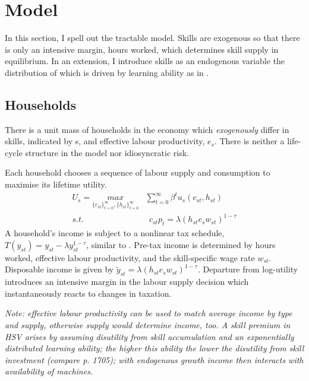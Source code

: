 \section{Model}

In this section, I spell out the tractable model. Skills are exogenous so that there is only an intensive margin, hours worked, which determines skill supply in equilibrium. In an extension, I introduce  skills as an endogenous variable the distribution of which is driven by learning ability as in \cite{Heathcote2017OptimalFramework}. 

\subsection{Households}
There is a unit mass of households in the economy which \textit{exogenously} differ in skills, indicated by s, and effective labour productivity, $e_{s}$. There is neither a life-cycle structure in the model nor idiosyncratic risk.

Each household chooses a sequence of labour supply and consumption to maximise its lifetime utility. 
\begin{align}
U_{s}=\underset{\{c_{st}\}_{t=0}^{\infty}, \{h_{st}\}_{t=0}^{\infty}}{max}&\sum_{t=0}^{\infty}\beta^t u_s(c_{st}, h_{st})\\
s.t.& \ \ c_{st}p_{t}=\lambda \left(h_{st}e_{s}w_{st}\right)^{1-\tau}
\end{align}
A household's income is subject to a nonlinear tax schedule, $T(y_{st})=y_{st}-\lambda y_{st}^{1-\tau}$, similar to \cite{Heathcote2017OptimalFramework}. Pre-tax income is determined by hours worked, effective labour productivity, and the skill-specific wage rate $w_{st}$. Disposable income is given by $\tilde{y}_{st}=\lambda \left(h_{st}e_{s}w_{st}\right)^{1-\tau}$.
Departure from log-utility introduces an intensive margin in the labour supply decision which instantaneously reacts to changes in taxation. 

\textit{Note: effective labour productivity can be used to match average income by type and supply, otherwise supply would determine income, too. A skill premium in HSV arises by assuming disutility from skill accumulation and an exponentially distributed learning ability; the higher this ability the lower the disutility from skill investment (compare p. 1705); with endogenous growth income then interacts with availability of machines. }

